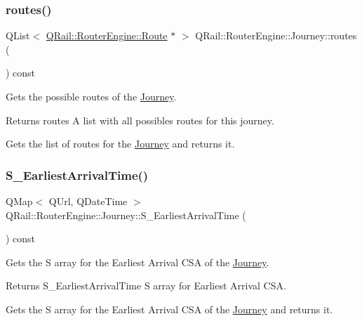 \subsubsection{\texorpdfstring{routes()}{routes()}}
{\footnotesize\ttfamily Q\+List$<$ \mbox{\hyperlink{classQRail_1_1RouterEngine_1_1Route}{Q\+Rail\+::\+Router\+Engine\+::\+Route}} $\ast$ $>$ Q\+Rail\+::\+Router\+Engine\+::\+Journey\+::routes (\begin{DoxyParamCaption}{ }\end{DoxyParamCaption}) const}



Gets the possible routes of the \mbox{\hyperlink{classQRail_1_1RouterEngine_1_1Journey}{Journey}}. 

\begin{DoxyReturn}{Returns}
routes A list with all possibles routes for this journey.
\end{DoxyReturn}
Gets the list of routes for the \mbox{\hyperlink{classQRail_1_1RouterEngine_1_1Journey}{Journey}} and returns it. \mbox{\label{classQRail_1_1RouterEngine_1_1Journey_a7fe25d3e03ff906868d6892b80008041}} 
\subsubsection{\texorpdfstring{S\_EarliestArrivalTime()}{S\_EarliestArrivalTime()}}
{\footnotesize\ttfamily Q\+Map$<$ Q\+Url, Q\+Date\+Time $>$ Q\+Rail\+::\+Router\+Engine\+::\+Journey\+::\+S\+\_\+\+Earliest\+Arrival\+Time (\begin{DoxyParamCaption}{ }\end{DoxyParamCaption}) const}



Gets the S array for the Earliest Arrival C\+SA of the \mbox{\hyperlink{classQRail_1_1RouterEngine_1_1Journey}{Journey}}. 

\begin{DoxyReturn}{Returns}
S\+\_\+\+Earliest\+Arrival\+Time S array for Earliest Arrival C\+SA.
\end{DoxyReturn}
Gets the S array for the Earliest Arrival C\+SA of the \mbox{\hyperlink{classQRail_1_1RouterEngine_1_1Journey}{Journey}} and returns it. \mbox{\label{classQRail_1_1RouterEngine_1_1Journey_a737847fba5cb96e84825dc5b28f4e8f2}} 
